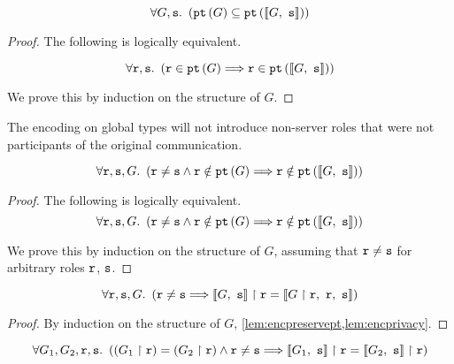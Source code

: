 \begin{lemma}
\[
\forall G, {\mathtt{s}}. ~ \left( {\textnormal{\texttt{pt}}\left({G}\right)} \subseteq {\textnormal{\texttt{pt}}\left({ \llbracket {G},~ {\mathtt{s}}  \rrbracket }\right)} \right)
\]
\label{lem:encpreservept}
\end{lemma}

\begin{proof}
The following is logically equivalent.

\[
\forall {\mathtt{r}}, {\mathtt{s}}. ~ \left(
{\mathtt{r}} \in {\textnormal{\texttt{pt}}\left({G}\right)} \Longrightarrow {\mathtt{r}} \in {\textnormal{\texttt{pt}}\left({ \llbracket {G},~ {\mathtt{s}}  \rrbracket }\right)}
\right)
\]

We prove this by induction on the structure of $G$.
\end{proof}

\begin{lemma}
The encoding on global types will not introduce
non-server roles that were not participants of the 
original communication.

\[
\forall {\mathtt{r}}, {\mathtt{s}}, G. ~ \left(
{\mathtt{r}} \neq {\mathtt{s}} \wedge {\mathtt{r}} \notin {\textnormal{\texttt{pt}}\left({G}\right)}
\Longrightarrow {\mathtt{r}} \notin {\textnormal{\texttt{pt}}\left({ \llbracket {G},~ {\mathtt{s}}  \rrbracket }\right)}
\right)
\]
\label{lem:encprivacy}
\end{lemma}

\begin{proof}
The following is logically equivalent.
\[
\forall {\mathtt{r}}, {\mathtt{s}}, G. ~ \left(
{\mathtt{r}} \neq {\mathtt{s}} \wedge {\mathtt{r}} \notin {\textnormal{\texttt{pt}}\left({G}\right)}
\Longrightarrow {\mathtt{r}} \notin {\textnormal{\texttt{pt}}\left({ \llbracket {G},~ {\mathtt{s}}  \rrbracket }\right)}
\right)
\]

We prove this by induction on the structure of $G$,
assuming that ${\mathtt{r}} \neq {\mathtt{s}}$ for arbitrary
roles ${\mathtt{r}}$, ${\mathtt{s}}$.
\end{proof}

\begin{lemma}

\[
\forall {\mathtt{r}}, {\mathtt{s}}, G. ~ \left(
{\mathtt{r}} \neq {\mathtt{s}} 
	\Longrightarrow
{ \llbracket {G},~ {\mathtt{s}}  \rrbracket } \upharpoonright {\mathtt{r}} = \llbracket { {G} \upharpoonright {\mathtt{r}}  },~{\mathtt{r}},~{\mathtt{s}} \rrbracket
\right)
\]

\label{lem:enclink}
\end{lemma}

\begin{proof}
By induction on the structure of $G$,
\cref{lem:encpreservept,lem:encprivacy}.
\end{proof}

\begin{lemma}
\[
\forall G_1, G_2, {\mathtt{r}}, {\mathtt{s}}. ~ \left(
({G_1} \upharpoonright {\mathtt{r}}) = ({G_2} \upharpoonright {\mathtt{r}}) \wedge {\mathtt{r}} \neq {\mathtt{s}}
	\Longrightarrow
{ \llbracket {G_1},~ {\mathtt{s}}  \rrbracket } \upharpoonright {\mathtt{r}} = {\llbracket {G_2},~{\mathtt{s}} \rrbracket} \upharpoonright {\mathtt{r}}
\right)
\]

\label{lem:encprojeq}
\end{lemma}

